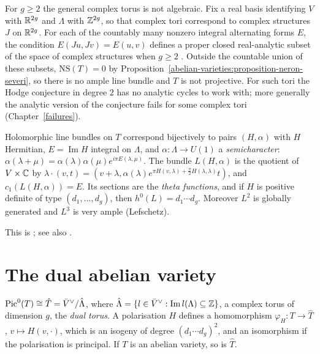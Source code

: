 \begin{counterexample}\label{abelian-varieties:counterexample-non-algebraic-torus}
For $g \geq 2$ the general complex torus is not algebraic. Fix a real basis identifying $V$ with $\mathbb{R}^{2g}$ and $\Lambda$ with $\mathbb{Z}^{2g}$, so that complex tori correspond to complex
structures $J$ on $\mathbb{R}^{2g}$. For each of the countably many nonzero integral alternating forms $E$, the condition $E(Ju, Jv) = E(u, v)$ defines a proper closed real-analytic subset of the
space of complex structures when $g \geq 2$ \cite{birkenhake-lange}. Outside the countable union of these subsets,
$\mathrm{NS}(T) = 0$ by Proposition~\ref{abelian-varieties:proposition-neron-severi}, so there is no ample line bundle and $T$ is not projective. For such tori the Hodge conjecture
in degree $2$ has no analytic cycles to work with; more generally the analytic version of the conjecture fails for some complex tori (Chapter~\ref{failures}).
\end{counterexample}

\begin{theorem}\label{abelian-varieties:theorem-appell-humbert}
Holomorphic line bundles on $T$ correspond bijectively to pairs $(H, \alpha)$ with $H$ Hermitian, $E = \operatorname{Im}H$ integral on $\Lambda$, and $\alpha \colon \Lambda \to U(1)$ a
\emph{semicharacter}: $\alpha(\lambda + \mu) = \alpha(\lambda)\alpha(\mu)e^{i\pi E(\lambda, \mu)}$. The bundle $L(H, \alpha)$ is the quotient of $V \times \mathbb{C}$ by
$\lambda \cdot (v, t) = (v + \lambda, \alpha(\lambda)e^{\pi H(v, \lambda) + \frac{\pi}{2}H(\lambda, \lambda)}t)$, and $c_1(L(H, \alpha)) = E$. Its sections are the
\emph{theta functions}, and if $H$ is positive definite of type $(d_1, \ldots, d_g)$, then $h^0(L) = d_1 \cdots d_g$. Moreover $L^2$ is globally generated and $L^3$ is very ample
(Lefschetz).
\end{theorem}

This is \cite{birkenhake-lange}; see also \cite{mumford-abelian}.

\section{The dual abelian variety}\label{abelian-varieties:section-dual}

\begin{proposition}\label{abelian-varieties:proposition-dual}
$\operatorname{Pic}^0(T) \cong \hat T = \bar V^\vee/\hat\Lambda$, where $\hat\Lambda = \{l \in \bar V^\vee : \operatorname{Im}l(\Lambda) \subseteq \mathbb{Z}\}$, a complex torus of dimension $g$, the
\emph{dual torus}. A polarisation $H$ defines a homomorphism $\varphi_H \colon T \to \hat T$, $v \mapsto H(v, \cdot)$, which is an isogeny of degree $(d_1 \cdots d_g)^2$, and an
isomorphism if the polarisation is principal. If $T$ is an abelian variety, so is $\hat T$.
\end{proposition}

